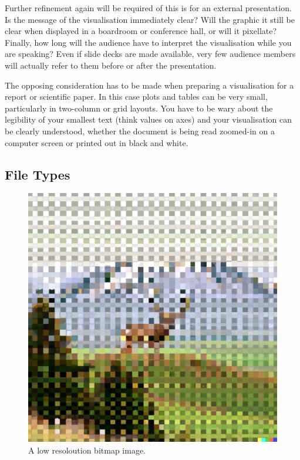 \documentclass[
  12pt,
]{book}
\begin{document}
Further refinement again will be required of this is for an external presentation. Is the message of the visualisation immediately clear? Will the graphic it still be clear when displayed in a boardroom or conference hall, or will it pixellate? Finally, how long will the audience have to interpret the visualisation while you are speaking? Even if slide decks are made available, very few audience members will actually refer to them before or after the presentation.

The opposing consideration has to be made when preparing a visualisation for a report or scientific paper. In this case plots and tables can be very small, particularly in two-column or grid layouts. You have to be wary about the legibility of your smallest text (think values on axes) and your visualisation can be clearly understood, whether the document is being read zoomed-in on a computer screen or printed out in black and white.

\hypertarget{file-types}{%
\subsection{File Types}\label{file-types}}

\begin{figure}
\centering
\includegraphics{images/303-data-visualisation/dalle-pixellated-image.png}
\caption{A low resoloution bitmap image.}
\end{figure}
\end{document}
